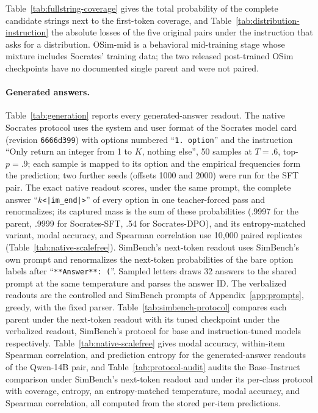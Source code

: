 \documentclass[11pt]{article}
\begin{document}
Table~\ref{tab:fullstring-coverage} gives the total probability of the
complete candidate strings next to the first-token coverage, and
Table~\ref{tab:distribution-instruction} the absolute losses of the five
original pairs under the instruction that asks for a distribution. OSim-mid \cite{zhou-etal-2026-odyssim} is a behavioral
mid-training stage whose mixture includes Socrates' training data; the two
released post-trained OSim checkpoints have no documented single parent and
were not paired.

\paragraph{Generated answers.}
Table~\ref{tab:generation} reports every generated-answer readout. The native
Socrates protocol uses the system and user format of the Socrates model card
(revision \texttt{6666d399}) with options numbered ``\texttt{1.\ option}'' and
the instruction ``Only return an integer from 1 to $K$, nothing else'', 50
samples at $T{=}.6$, top-$p{=}.9$; each sample is mapped to its option and the
empirical frequencies form the prediction; two further seeds (offsets 1000
and 2000) were run for the SFT pair. The exact native readout scores, under
the same prompt, the complete answer ``$k$\texttt{<|im\_end|>}'' of every
option in one teacher-forced pass and renormalizes; its captured mass is the
sum of these probabilities (.9997 for the parent, .9999 for Socrates-SFT,
.54 for Socrates-DPO), and its entropy-matched variant, modal accuracy, and
Spearman correlation use 10,000 paired replicates
(Table~\ref{tab:native-scalefree}). SimBench's next-token readout uses
SimBench's own prompt and renormalizes the next-token probabilities of the
bare option labels after ``\texttt{**Answer**: (}''. Sampled letters draws 32
answers to the shared prompt at the same temperature and parses the answer ID.
The verbalized readouts are the controlled and SimBench prompts of
Appendix~\ref{app:prompts}, greedy, with the fixed parser.
Table~\ref{tab:simbench-protocol} compares each parent under the next-token
readout with its tuned checkpoint under the verbalized readout, SimBench's
protocol for base and instruction-tuned models respectively. Table~\ref{tab:native-scalefree} gives modal accuracy, within-item Spearman correlation, and prediction entropy for the generated-answer readouts of the Qwen-14B pair, and Table~\ref{tab:protocol-audit} audits the Base--Instruct comparison under SimBench's next-token readout and under its per-class protocol with coverage, entropy, an entropy-matched temperature, modal accuracy, and Spearman correlation, all computed from the stored per-item predictions.
\end{document}
